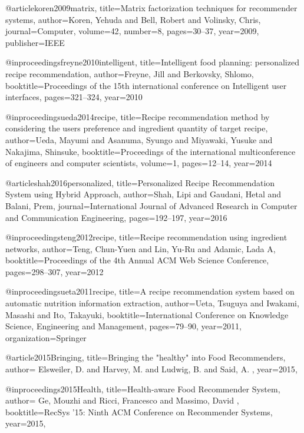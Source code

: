 @article{koren2009matrix,
  title={Matrix factorization techniques for recommender systems},
  author={Koren, Yehuda and Bell, Robert and Volinsky, Chris},
  journal={Computer},
  volume={42},
  number={8},
  pages={30--37},
  year={2009},
  publisher={IEEE}
}

@inproceedings{freyne2010intelligent,
  title={Intelligent food planning: personalized recipe recommendation},
  author={Freyne, Jill and Berkovsky, Shlomo},
  booktitle={Proceedings of the 15th international conference on Intelligent user interfaces},
  pages={321--324},
  year={2010}
}

@inproceedings{ueda2014recipe,
  title={Recipe recommendation method by considering the users preference and ingredient quantity of target recipe},
  author={Ueda, Mayumi and Asanuma, Syungo and Miyawaki, Yusuke and Nakajima, Shinsuke},
  booktitle={Proceedings of the international multiconference of engineers and computer scientists},
  volume={1},
  pages={12--14},
  year={2014}
}

@article{shah2016personalized,
  title={Personalized Recipe Recommendation System using Hybrid Approach},
  author={Shah, Lipi and Gaudani, Hetal and Balani, Prem},
  journal={International Journal of Advanced Research in Computer and Communication Engineering},
  pages={192--197},
  year={2016}
}

@inproceedings{teng2012recipe,
  title={Recipe recommendation using ingredient networks},
  author={Teng, Chun-Yuen and Lin, Yu-Ru and Adamic, Lada A},
  booktitle={Proceedings of the 4th Annual ACM Web Science Conference},
  pages={298--307},
  year={2012}
}

@inproceedings{ueta2011recipe,
  title={A recipe recommendation system based on automatic nutrition information extraction},
  author={Ueta, Tsuguya and Iwakami, Masashi and Ito, Takayuki},
  booktitle={International Conference on Knowledge Science, Engineering and Management},
  pages={79--90},
  year={2011},
  organization={Springer}
}

@article{2015Bringing,
  title={Bringing the "healthy" into Food Recommenders},
  author={ Elsweiler, D.  and  Harvey, M.  and  Ludwig, B.  and  Said, A. },
  year={2015},
}

@inproceedings{2015Health,
  title={Health-aware Food Recommender System},
  author={ Ge, Mouzhi  and  Ricci, Francesco  and  Massimo, David },
  booktitle={RecSys '15: Ninth ACM Conference on Recommender Systems},
  year={2015},
}


